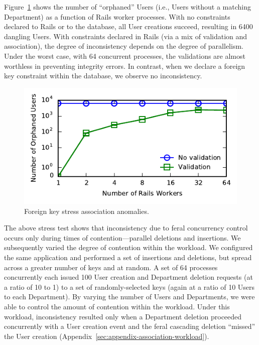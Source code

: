Figure~\ref{fig:fk-stress} shows the number of ``orphaned'' Users
(i.e., Users without a matching Department) as a
function of Rails worker processes. With no constraints declared to
Rails or to the database, all User creations succeed, resulting in
6400 dangling Users. With constraints declared in Rails (via a mix of
validation and association), the degree of inconsistency depends on
the degree of parallelism. Under the worst case, with 64 concurrent
processes, the validations are almost worthless in preventing
integrity errors. In contrast, when we declare a foreign key constraint
within the database, we observe no inconsistency.

\begin{figure}
\includegraphics[width=\columnwidth]{figs/fk-stress-violations.pdf}\vspace{-1em}
\caption{Foreign key stress association anomalies.}
\label{fig:fk-stress}
\end{figure}

The above stress test shows that inconsistency due to feral
concurrency control occurs only during times of contention---parallel
deletions and insertions. We subsequently varied the degree of
contention within the workload. We configured the same application and
performed a set of insertions and deletions, but spread across a
greater number of keys and at random. A set of 64 processes
concurrently each issued 100 User creation and Department deletion
requests (at a ratio of 10 to 1) to a set of randomly-selected keys
(again at a ratio of 10 Users to each Department). By varying the
number of Users and Departments, we were able to control the amount of
contention within the workload. Under this workload, inconsistency
resulted only when a Department deletion proceeded concurrently with a
User creation event and the feral cascading deletion ``missed'' the
User creation (Appendix~\ref{sec:appendix-association-workload}).

